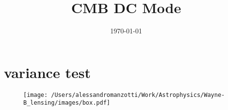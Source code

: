



\title{CMB DC Mode}
\author{}
\date{\today}

\maketitle


%
%
%

%
%

\section{variance test}



\begin{figure}[htbp]
\begin{center}
\texttt{[image: /Users/alessandromanzotti/Work/Astrophysics/Wayne-B\_lensing/images/box.pdf]}
\end{center}
\end{figure}


